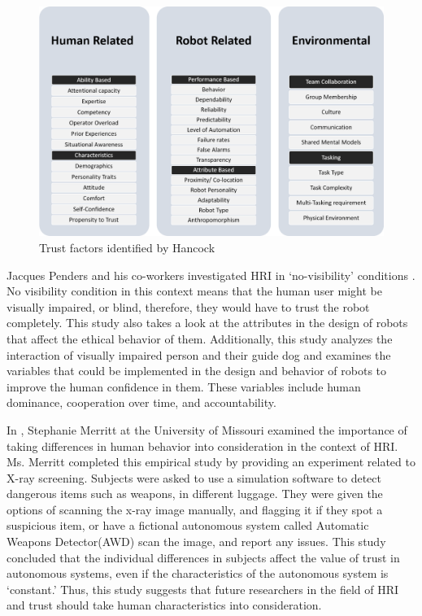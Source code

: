 \documentclass[runningheads,a4paper]{llncs}
\begin{document}
\begin{figure}
    \centering
        \includegraphics[width=\textwidth]{Figures/TrustFactors.png}
    \caption{Trust factors identified by Hancock \cite{hancock2011meta}}
\end{figure}

\newpage

Jacques Penders and his co-workers investigated HRI in `no-visibility' conditions \cite{penders2013enhancing}. No visibility condition in this context means that the human user might be visually impaired, or blind, therefore, they would have to trust the robot completely. This study also takes a look at the attributes in the design of robots that affect the ethical behavior of them. Additionally, this study analyzes the interaction of visually impaired person and their guide dog and examines the variables that could be implemented in the design and behavior of robots to improve the human confidence in them. These variables include human dominance, cooperation over time, and accountability.

In \cite{merritt2008not}, Stephanie Merritt at the University of Missouri examined the importance of taking differences in human behavior into consideration in the context of HRI. Ms. Merritt completed this empirical study by providing an experiment related to  X-ray screening. Subjects were asked to use a simulation software to detect dangerous items such as weapons, in different luggage. They were given the options of scanning the x-ray image manually, and flagging it if they spot a suspicious item, or have a fictional autonomous system called  Automatic Weapons Detector(AWD) scan the image, and report any issues. This study concluded that the individual differences in subjects affect the value of trust in autonomous systems, even if the characteristics of the autonomous system is `constant.' Thus, this study suggests that future researchers in the field of HRI and trust should take human characteristics into consideration.
\end{document}
